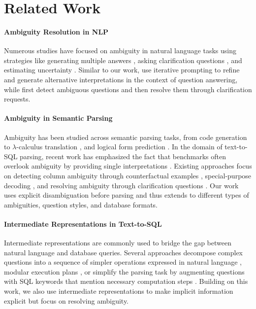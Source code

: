 \section{Related Work}
\paragraph{Ambiguity Resolution in NLP} Numerous studies have focused on ambiguity in natural language tasks using strategies like generating multiple answers \citep{min-etal-2020-ambigqa}, asking clarification questions \citep{lee-etal-2023-asking, Zhang2024ModelingFC}, and estimating uncertainty \citep{cole-etal-2023-selectively}. Similar to our work, \citet{sun-etal-2023-answering} use iterative prompting to refine and generate alternative interpretations in the context of question answering, while \citet{kim-etal-2024-aligning} first detect ambiguous questions and then resolve them through clarification requests. 

 \paragraph{Ambiguity in Semantic Parsing} Ambiguity has been studied across semantic parsing tasks, from code generation \citep{li-etal-2023-python, mu2023clarifygpt} to $\lambda$-calculus translation \citep{rasmussen-schuler-2020-corpus},  and logical form prediction \citep{eskin-2024-zero}. In the domain of text-to-SQL parsing, recent work has emphasized the fact that benchmarks often overlook ambiguity by providing single interpretations \citep{Floratou2024, pourreza-rafiei-2023-evaluating}. Existing approaches focus on detecting column ambiguity through counterfactual examples \cite{wang-etal-2023-know}, special-purpose decoding \citep{bhaskar-etal-2023-benchmarking}, and resolving ambiguity through clarification questions \citep{practiq-dataset}. Our work uses explicit disambiguation before parsing and thus extends to different types of ambiguities, question styles, and database formats.

\paragraph{Intermediate Representations in Text-to-SQL} Intermediate representations are commonly used to bridge the gap between natural language and database queries. Several approaches decompose complex questions into a sequence of simpler operations expressed in natural language   \cite{wolfson-etal-2022-weakly,saparina-osokin-2021-sparqling}, modular execution plans \cite{eyal-etal-2023-semantic}, or simplify the parsing task by augmenting questions with SQL keywords that mention necessary computation steps \cite{liu2024keyinstkeywordinstructionimproving, caferoğlu2024esqldirectschemalinking}. Building on this work, we also use intermediate representations to make implicit information explicit but focus on resolving ambiguity.

